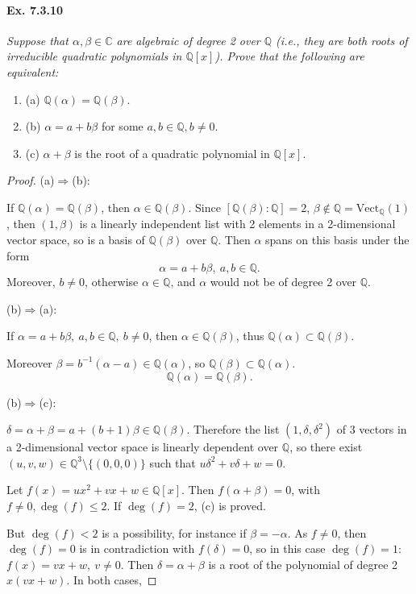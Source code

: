 \documentclass[11pt,a4paper]{article}
\newcommand{\be} {\begin{enumerate}}
\newcommand{\ee} {\end{enumerate}}
\newcommand{\Q}{\mathbb{Q}}
\newcommand{\C}{\mathbb{C}}
\begin{document}
\paragraph{Ex. 7.3.10}

{\it Suppose that $\alpha,\beta \in \C$ are algebraic of degree 2 over $\Q$ (i.e., they are both roots of irreducible quadratic polynomials in $\Q[x]$). Prove that the following are equivalent:
\be
\item[(a)] $\Q(\alpha) = \Q(\beta)$.
\item[(b)] $\alpha = a + b \beta$ for some $a,b \in \Q, b\ne 0$.
\item[(c)] $\alpha + \beta$ is the root of a quadratic polynomial in $\Q[x]$.
\ee
}

\begin{proof}


(a)$\Rightarrow$(b):

If $\Q(\alpha) = \Q(\beta)$, then $\alpha \in \Q(\beta)$. Since $[\Q(\beta):\Q] = 2$, $\beta \not \in \Q = \mathrm{Vect}_\Q(1)$, then $(1,\beta)$ is a linearly independent list with 2 elements in a 2-dimensional vector space, so is a basis of $\Q(\beta)$ over $\Q$. Then $\alpha$ spans on this basis under the form
 $$\alpha= a + b \beta, \ a,b\in \Q.$$
Moreover, $b\neq 0$, otherwise $\alpha \in \Q$, and $\alpha$ would not be of degree 2 over $\Q$.

\bigskip

(b)$\Rightarrow$(a):

If $\alpha = a+b\beta , \ a,b \in \Q, \ b\neq 0$, then $\alpha \in \Q(\beta)$, thus $\Q(\alpha) \subset \Q(\beta)$. 

Moreover $\beta  = b^{-1}(\alpha -a) \in \Q(\alpha)$, so $\Q(\beta) \subset \Q(\alpha)$.
$$\Q(\alpha) = \Q(\beta).$$

\bigskip

(b)$\Rightarrow$(c):

$\delta = \alpha + \beta = a+(b+1) \beta \in \Q(\beta)$. Therefore the list $(1,\delta,\delta^2)$ of 3 vectors in a 2-dimensional vector space is linearly dependent over $\Q$, so there exist $(u,v,w) \in \Q^3 \setminus\{(0,0,0)\}$ such that $u\delta^2 + v\delta + w = 0$.

Let $f(x) = u x^2+vx+w \in \Q[x]$. Then $f(\alpha + \beta) = 0$, with $f\neq 0, \deg(f) \leq 2$. If $\deg(f)=2$, (c) is proved.

But $\deg(f)<2$ is a possibility, for instance if $\beta = -\alpha$. As $f\neq 0$, then  $\deg(f)=0$  is in contradiction with $f(\delta) = 0$,  so in this case $\deg(f) = 1$: $f(x) = vx+w,\ v\neq 0$. Then $\delta=\alpha+ \beta$ is a root of the polynomial of degree 2 $x(vx+w)$. In both cases,


\end{proof}
\end{document}
